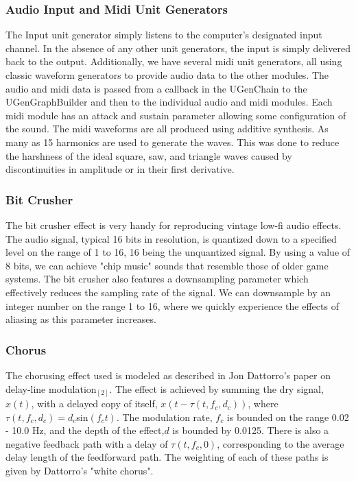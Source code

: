 \documentclass[pdftext,twoside,10pt]{article}
\begin{document}
\subsubsection*{Audio Input and Midi Unit Generators} The Input unit generator simply listens to the computer's designated input channel. In the absence of any other unit generators, the input is simply delivered back to the output. Additionally, we have several midi unit generators, all using classic waveform generators to provide audio data to the other modules. The audio and midi data is passed from a callback in the UGenChain to the UGenGraphBuilder and then to the individual audio and midi modules. Each midi module has an attack and sustain parameter allowing some configuration of the sound. The midi waveforms are all produced using additive synthesis. As many as 15 harmonics are used to generate the waves. This was done to reduce the harshness of the ideal square, saw, and triangle waves caused by discontinuities in amplitude or in their first derivative.

\subsubsection*{Bit Crusher}
The bit crusher effect is very handy for reproducing vintage low-fi audio effects. The audio signal, typical 16 bits in resolution, is quantized down to a specified level on the range of 1 to 16, 16 being the unquantized signal. By using a value of 8 bits, we can achieve "chip music" sounds that resemble those of older game systems. The bit crusher also features a downsampling parameter which effectively reduces the sampling rate of the signal. We can downsample by an integer number on the range 1 to 16, where we quickly experience the effects of aliasing as this parameter increases.

\subsubsection*{Chorus} 
The chorusing effect used is modeled as described in Jon Dattorro's paper on delay-line modulation$_{[2]}$. The effect is achieved by summing the dry signal, $x(t)$, with a delayed copy of itself, $x(t - \tau(t,f_c,d_c))$, where $\tau(t,f_c,d_c) =d_c$sin$(f_ct)$. The modulation rate, $f_c$ is bounded on the range 0.02 - 10.0 Hz, and the depth of the effect,$d$ is bounded by 0.0125. There is also a negative feedback path with a delay of $\tau(t,f_c,0)$, corresponding to the average delay length of the feedforward path. The weighting of each of these paths is given by Dattorro's "white chorus".
\end{document}

